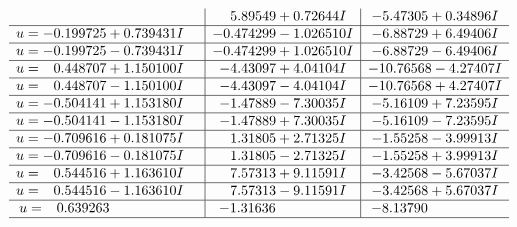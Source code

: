 \documentclass[1p]{elsarticle_modified}
\theoremstyle{definition}
\begin{document}
$$\begin{array}{c|c|c}
 & \phantom{-}5.89549 + 0.72644 I & -5.47305 + 0.34896 I \\ \hline\begin{aligned}
u &= -0.199725 + 0.739431 I\end{aligned}
 & -0.474299 - 1.026510 I & -6.88729 + 6.49406 I \\ \hline\begin{aligned}
u &= -0.199725 - 0.739431 I\end{aligned}
 & -0.474299 + 1.026510 I & -6.88729 - 6.49406 I \\ \hline\begin{aligned}
u &= \phantom{-}0.448707 + 1.150100 I\end{aligned}
 & -4.43097 + 4.04104 I & -10.76568 - 4.27407 I \\ \hline\begin{aligned}
u &= \phantom{-}0.448707 - 1.150100 I\end{aligned}
 & -4.43097 - 4.04104 I & -10.76568 + 4.27407 I \\ \hline\begin{aligned}
u &= -0.504141 + 1.153180 I\end{aligned}
 & -1.47889 - 7.30035 I & -5.16109 + 7.23595 I \\ \hline\begin{aligned}
u &= -0.504141 - 1.153180 I\end{aligned}
 & -1.47889 + 7.30035 I & -5.16109 - 7.23595 I \\ \hline\begin{aligned}
u &= -0.709616 + 0.181075 I\end{aligned}
 & \phantom{-}1.31805 + 2.71325 I & -1.55258 - 3.99913 I \\ \hline\begin{aligned}
u &= -0.709616 - 0.181075 I\end{aligned}
 & \phantom{-}1.31805 - 2.71325 I & -1.55258 + 3.99913 I \\ \hline\begin{aligned}
u &= \phantom{-}0.544516 + 1.163610 I\end{aligned}
 & \phantom{-}7.57313 + 9.11591 I & -3.42568 - 5.67037 I \\ \hline\begin{aligned}
u &= \phantom{-}0.544516 - 1.163610 I\end{aligned}
 & \phantom{-}7.57313 - 9.11591 I & -3.42568 + 5.67037 I \\ \hline\begin{aligned}
u &= \phantom{-}0.639263\phantom{ +0.000000I}\end{aligned}
 & -1.31636\phantom{ +0.000000I} & -8.13790\phantom{ +0.000000I}\\
 \hline 
 \end{array}$$\newpage
\end{document}

